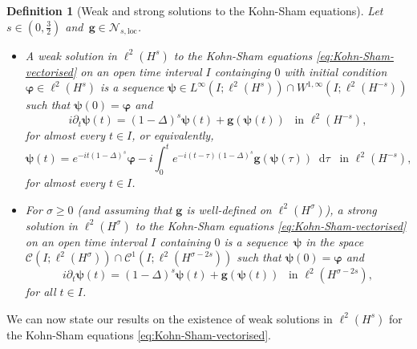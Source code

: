 \documentclass[12pt,a4paper]{amsart}
\newtheorem{definition}[theorem]{Definition}
\numberwithin{equation}{section}
\newcommand{\ulg}{\boldsymbol{g}}
\newcommand{\ulpsi}{\boldsymbol{\psi}}
\newcommand{\ulphi}{\boldsymbol{\varphi}}
\newcommand*\diff{\mathop{}\!\mathrm{d}}
\newcommand{\Nloc}{\mathscr{N}_{s,\mathrm{loc}}}
\begin{document}
	\begin{definition}[Weak and strong solutions to the Kohn-Sham equations]\label{def:solutions}Let $s\in(0,\frac{3}{2})$ and~$ \ulg \in \Nloc$.
		\begin{itemize}
			\item A weak solution in $\ell^2(H^s)$ to the Kohn-Sham equations \eqref{eq:Kohn-Sham-vectorised} on an open time interval $I $ containging $0$ with initial condition $ \ulphi \in \ell^2(H^s) $ is a sequence $ \ulpsi \in L^\infty(I; \ell^2(H^s)) \cap W^{1,\infty}(I; \ell^2(H^{-s}))$ such that $ \ulpsi(0) = \ulphi $ and
			\begin{equation}
				i \partial_t \ulpsi(t) = (1-\Delta)^s \ulpsi(t) + \ulg(\ulpsi(t)) \;\ \text{ in } \ell^2(H^{-s}),
			\end{equation}
			for almost every $t \in I$, 
			or equivalently, 
			\begin{equation}
				\ulpsi(t) = e^{-it (1-\Delta)^s} \ulphi - i \int_{0}^{t}  e^{-i(t-\tau)(1-\Delta)^s} \ulg(\ulpsi(\tau)) \diff  \tau \;\ \text{ in } \ell^2(H^{-s}) ,
			\end{equation}
			for almost every $t \in I$.
			\item For $\sigma\ge0$ (and assuming that $\ulg$ is well-defined on $\ell^2(H^\sigma)$), a strong solution in $\ell^2(H^\sigma)$ to the Kohn-Sham equations \eqref{eq:Kohn-Sham-vectorised} on an open time interval $I $ containing $0$ is a sequence~$ \ulpsi$ in the space~$\mathscr{C}(I; \ell^2(H^\sigma)) \cap \mathscr{C}^1(I; \ell^2(H^{\sigma-2s}))$ such that $ \ulpsi(0) = \ulphi $ and
			\begin{equation}
				i \partial_t \ulpsi(t) = (1-\Delta)^s \ulpsi(t) + \ulg(\ulpsi(t)) \;\ \text{ in } \ell^2(H^{\sigma-2s}) ,
			\end{equation}
			for all $t\in I$. 
		\end{itemize}
	\end{definition}
	
	
	We can now state our results on the existence of weak solutions in $ \ell^2(H^{s}) $ for the Kohn-Sham equations \eqref{eq:Kohn-Sham-vectorised}. 
	
	
\end{document}
